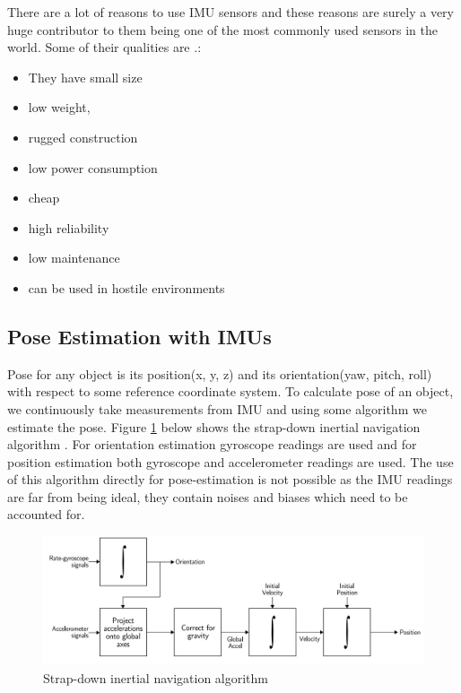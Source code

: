 There are a lot of reasons to use IMU sensors and these reasons are surely a very huge contributor to them being one of the most commonly used sensors in the world. Some of their qualities are \citep{woodman2007introduction}.:

\begin{itemize}
\item They have small size
\item low weight,
\item rugged construction 
\item low power consumption 
\item cheap
\item high reliability 
\item low maintenance
\item can be used in hostile environments 
\end{itemize}

\subsection{Pose Estimation with IMUs}
Pose for any object is its position(x, y, z) and its orientation(yaw, pitch, roll) with respect to some reference coordinate system. To calculate pose of an object, we continuously take measurements from IMU and using some algorithm we estimate the pose. Figure \ref{fig:strapdown_imu} below shows the strap-down inertial navigation algorithm \citep{woodman2007introduction}. For orientation estimation gyroscope readings are used and for position estimation both gyroscope and accelerometer readings are used. The use of this algorithm directly for pose-estimation is not possible as the IMU readings are far from being ideal, they contain noises and biases \citep{woodman2007introduction} which need to be accounted for.

\begin{figure}
\includegraphics[scale=0.2]{images/fig_chapter2/strap_imu_algo.png}
\caption{Strap-down inertial navigation algorithm \citep{woodman2007introduction}}
\label{fig:strapdown_imu}
\end{figure}

